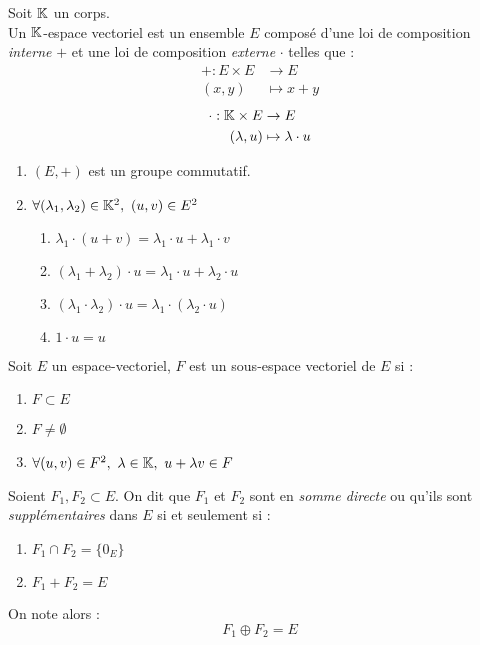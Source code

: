 \begin{definition}
	Soit $\mathbb{K}$ un corps. 
	\\
	Un $\mathbb{K}$-espace vectoriel est un ensemble $E$ composé d'une loi de composition \emph{interne} \og $+$ \fg et une loi de composition \emph{externe} \og $\cdot$ \fg telles que :
	\begin{align*}
		+ : E \times E &\to E \\
		(x, y) &\mapsto x + y
	\end{align*}
	\begin{align*}
		\cdot : \mathbb{K} \times E &\to E \\
		(\lambda, u) &\mapsto \lambda \cdot u
	\end{align*}
	\begin{enumerate}
		\item $(E, +)$ est un groupe commutatif.
		\item $\forall (\lambda_1, \lambda_2) \in \mathbb{K}^2,\ (u, v) \in E^2$
		\begin{multicols}{2}
            \begin{enumerate}
			\item $\lambda_1 \cdot (u + v) = \lambda_1 \cdot u + \lambda_1 \cdot v$
			\item $(\lambda_1 + \lambda_2) \cdot u = \lambda_1 \cdot u + \lambda_2 \cdot u$
			\item $(\lambda_1 \cdot \lambda_2) \cdot u = \lambda_1 \cdot (\lambda_2 \cdot u)$
			\item $1 \cdot u = u$
		\end{enumerate}
        \end{multicols}
	\end{enumerate}
\end{definition}

\begin{definition}
	Soit $E$ un espace-vectoriel, $F$ est un sous-espace vectoriel de $E$ si :
	\begin{multicols}{2}
	    \begin{enumerate}
    		\item $F \subset E$
    		\item $F \neq \emptyset$
    		\item $\forall (u, v) \in F^2,\ \lambda \in \mathbb{K},\ u + \lambda v \in F$
    	\end{enumerate}
	\end{multicols}
\end{definition}

\begin{definition}
	Soient $F_1, F_2 \subset E$. On dit que $F_1$ et $F_2$ sont en \emph{somme directe} ou qu'ils sont \emph{supplémentaires} dans $E$ si et seulement si :
	\begin{multicols}{2}
	    \begin{enumerate}
		\item $F_1 \cap F_2 = \{ 0_E \}$
		\item $F_1 + F_2 = E$
	\end{enumerate}
	\end{multicols}
	On note alors :
	\[ F_1 \oplus F_2 = E \]
\end{definition}

